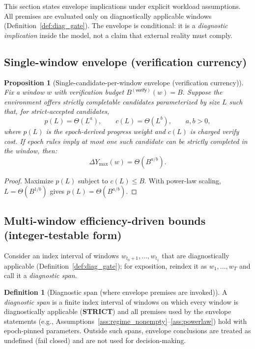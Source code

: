 \documentclass[11pt]{article}
\newcommand{\term}[1]{\emph{#1}}
\newcommand{\1}{\mathbf{1}}
\theoremstyle{definition}
\newtheorem{definition}{Definition}
\theoremstyle{plain}
\newtheorem{proposition}{Proposition}
\begin{document}
This section states envelope implications under explicit workload assumptions. All premises are evaluated only on diagnostically applicable windows (Definition~\ref{def:diag_gate}). The envelope is conditional: it is a \emph{diagnostic implication} inside the model, not a claim that external reality must comply.

\subsection{Single-window envelope (verification currency)}

\begin{proposition}[Single-candidate-per-window envelope (verification currency)]
\label{prop:envelope_single}
Fix a window $w$ with verification budget $B^{(\textsf{verify})}(w)=B$. Suppose the environment offers strictly completable candidates parameterized by size $L$ such that, for strict-accepted candidates,
\[
p(L)=\Theta(L^{a}),\qquad c(L)=\Theta(L^{b}),\qquad a,b>0,
\]
where $p(L)$ is the epoch-derived progress weight and $c(L)$ is charged verify cost. If epoch rules imply at most one such candidate can be strictly completed in the window, then:
\[
\Delta Y_{\max}(w)=\Theta\!\left(B^{a/b}\right).
\]
\end{proposition}
\begin{proof}
Maximize $p(L)$ subject to $c(L)\le B$. With power-law scaling, $L=\Theta(B^{1/b})$ gives $p(L)=\Theta(B^{a/b})$.
\end{proof}

\subsection{Multi-window efficiency-driven bounds (integer-testable form)}

Consider an index interval of windows $w_{t_0+1},\dots,w_{t_1}$ that are diagnostically applicable (Definition~\ref{def:diag_gate}); for exposition, reindex it as $w_1,\dots,w_T$ and call it a \term{diagnostic span}.

\begin{definition}[Diagnostic span (where envelope premises are invoked)]
\label{def:diag_span}
A \term{diagnostic span} is a finite index interval of windows on which every window is diagnostically applicable (\textbf{STRICT}) and all premises used by the envelope statements (e.g., Assumptions~\ref{ass:regime_nonempty}--\ref{ass:powerlaw}) hold with epoch-pinned parameters.
Outside such spans, envelope conclusions are treated as undefined (fail closed) and are not used for decision-making.
\end{definition}
\end{document}
